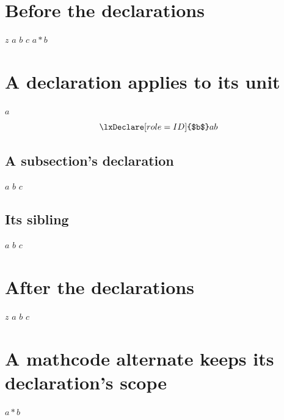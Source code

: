 \documentclass{article}
\begin{document}
%
\section{Before the declarations}
$z$ $a$ $b$ $c$ $a*b$

\section{A declaration applies to its unit}
%
$a$
\begin{equation}\lxDeclare[role=ID]{$b$} a b\end{equation}

\subsection{A subsection's declaration}
%
$a$ $b$ $c$

\subsection{Its sibling}
$a$ $b$ $c$

\section{After the declarations}
$z$ $a$ $b$ $c$

\section{A mathcode alternate keeps its declaration's scope}
\lxDeclare[scope=section,role=ADDOP]{$*$}%
$a*b$
\end{document}
